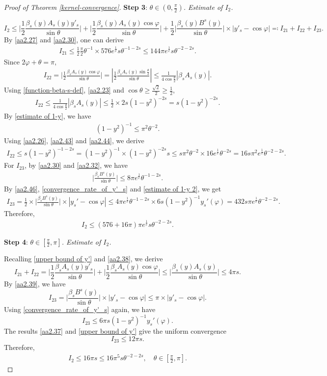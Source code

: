\documentclass[reqno,10pt]{amsart}
\let\vf=\varphi
\def\th{\theta}
\newcommand{\ben}{\begin{eqnarray}}
\newcommand{\een}{\end{eqnarray}}
\newcommand{\beno}{\begin{eqnarray*}}
\newcommand{\eeno}{\end{eqnarray*}}
\theoremstyle{definition}
\numberwithin{equation}{section}
\begin{document}
\begin{proof}[Proof of Theorem \ref{kernel-convergence}]
\textbf{Step 3}: \emph{$\th\in(0,\frac{\pi}{2})$. Estimate of $I_2$.}

$$I_2\le \Big|\frac{1}{2}\frac{\beta_s(y) A_s(y)y'_s}{\sin\th}\Big|+\Big|\frac{1}{2}\frac{\beta_s(y) A_s(y)\cos\vf}{\sin\th}\Big|+\frac{1}{2}\Big|\frac{\beta_s(y)B^{s}(y)}{\sin\th}\Big|\times|y'_s-\cos\vf|\eqqcolon I_{21}+I_{22}+I_{23}.$$
By \eqref{aa2.27} and \eqref{aa2.30}, one can derive
\ben\label{estimate-of-I_21}
I_{21}\le \frac{1}{2}\frac{\pi}{2}\th^{-1}\times576e^{\frac{1}{e}}s\th^{-1-2s} \le 144\pi e^{\frac{1}{e}}s\th^{-2-2s}.
\een
Since $2\vf+\th=\pi$,
\ben\label{aa2.42}
I_{22}=\Big|\frac{1}{2}\frac{\beta_s A_s(y)\cos\vf}{\sin\th}\Big|=|\frac{1}{2}\frac{\beta_s A_s(y)\sin\frac{\th}{2}}{\sin\th}|\le \frac{1}{4\cos\frac{\th}{2}}|\beta_sA_s(y)|.
\een
Using \eqref{function-beta-s-def}, \eqref{aa2.23} and $\cos\th\ge \frac{\sqrt{2}}{2}\ge \frac{1}{2}$,
\ben\label{aa2.43} 
I_{22}\le\frac{1}{4\cos\frac{\th}{2}} |\beta_sA_s(y)|\le \frac{1}{2}\times2s(1-y^2)^{-2s}=s(1-y^2)^{-2s}.
\een
By \eqref{estimate of 1-y}, we have 
\ben\label{aa2.44}
(1-y^2)^{-1}\le \pi^{2}\th^{-2}. 
\een
Using \eqref{aa2.26}, \eqref{aa2.43} and \eqref{aa2.44}, we derive
\ben\label{estimate-of-I_22}
I_{22}\le s(1-y^2)^{-1-2s}=(1-y^2)^{-1}\times (1-y^2)^{-2s}s\le s\pi^2\th^{-2}\times 16e^{\frac{1}{e}}\th^{-2s}=16s\pi^2e^{\frac{1}{e}}\th^{-2-2s}.
\een
For $I_{23}$, by \eqref{aa2.30} and \eqref{aa2.32}, we have
\ben\label{aa2.46}
\Big|\frac{\beta_sB^{s}(y)}{\sin\th}\Big|\le  8\pi e^{\frac{1}{e}}\th^{-1-2s}.
\een
By \eqref{aa2.46}, \eqref{convergence_rate_of_y'_s} and \eqref{estimate of 1-y 2}, we get
\beno
I_{23}=\frac{1}{2}\times\Big|\frac{\beta_sB^{s}(y)}{\sin\th}\Big|\times |y_s'-\cos\vf|\le 4\pi e^{\frac{1}{e}}\th^{-1-2s}\times 6s(1-y^2)^{-1}y_s'(\vf)=432s\pi e^{\frac{1}{e}}\th^{-2-2s}.
\eeno
Therefore, 
\ben\label{estimate of I_2-1}
I_2\le (576+16\pi)\pi e^{\frac{1}{e}}s\th^{-2-2s}.
\een

\textbf{Step 4}: \emph{$\th\in[\frac{\pi}{2},\pi]$. Estimate of $I_2$.}

Recalling \eqref{upper bound of y'} and \eqref{aa2.38}, we derive
$$I_{21}+I_{22}=\Big|\frac{1}{2}\frac{\beta_s A_s(y)y'_s}{\sin\th}\Big|+\Big|\frac{1}{2}\frac{\beta_s A_s(y)\cos\vf}{\sin\th}\Big|\le\Big|\frac{\beta_s(y)A_s(y)}{\sin\th}\Big|\le 4\pi  s.$$
By \eqref{aa2.39}, we have
$$I_{23}=\Big|\frac{\beta_sB^{s}(y)}{\sin\th}\Big|\times|y'_s-\cos\vf|\le \pi\times|y'_s-\cos\vf|.$$
Using \eqref{convergence_rate_of_y'_s} again, we have
$$I_{23}\le 6\pi s(1-y^2)^{-1}y_s'(\vf).$$
The results \eqref{aa2.37} and \eqref{upper bound of y'} give the uniform convergence
$$I_{23}\le 12\pi s.$$
Therefore,
\ben\label{estimate of I_2-2}
I_{2}\le 16\pi s \le 16\pi^5 s\th^{-2-2s},\quad \th\in[\frac{\pi}{2},\pi].
\een


\end{proof}
\end{document}

